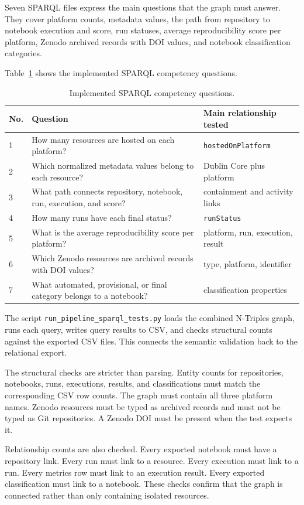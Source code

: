 Seven SPARQL files express the main questions that the graph must answer. They cover platform counts, metadata values, the path from repository to notebook execution and score, run statuses, average reproducibility score per platform, Zenodo archived records with DOI values, and notebook classification categories.

Table~\ref{tab:sparql-questions} shows the implemented SPARQL competency questions.

\begin{table}[ht]
\centering
\caption{Implemented SPARQL competency questions.}
\label{tab:sparql-questions}
\footnotesize
\begin{tabularx}{\textwidth}{@{}p{0.9cm}p{5.3cm}X@{}}
\toprule
No. & Question & Main relationship tested\tabularnewline
\midrule
1 & How many resources are hosted on each platform? & \texttt{hostedOnPlatform}\tabularnewline
2 & Which normalized metadata values belong to each resource? & Dublin Core plus platform\tabularnewline
3 & What path connects repository, notebook, run, execution, and score? & containment and activity links\tabularnewline
4 & How many runs have each final status? & \texttt{runStatus}\tabularnewline
5 & What is the average reproducibility score per platform? & platform, run, execution, result\tabularnewline
6 & Which Zenodo resources are archived records with DOI values? & type, platform, identifier\tabularnewline
7 & What automated, provisional, or final category belongs to a notebook? & classification properties\tabularnewline
\bottomrule
\end{tabularx}
\end{table}

The script \texttt{run\_pipeline\_sparql\_tests.py} loads the combined N-Triples graph, runs each query, writes query results to CSV, and checks structural counts against the exported CSV files. This connects the semantic validation back to the relational export.

The structural checks are stricter than parsing. Entity counts for repositories, notebooks, runs, executions, results, and classifications must match the corresponding CSV row counts. The graph must contain all three platform names. Zenodo resources must be typed as archived records and must not be typed as Git repositories. A Zenodo DOI must be present when the test expects it.

Relationship counts are also checked. Every exported notebook must have a repository link. Every run must link to a resource. Every execution must link to a run. Every metrics row must link to an execution result. Every exported classification must link to a notebook. These checks confirm that the graph is connected rather than only containing isolated resources.

